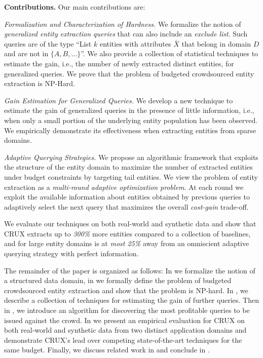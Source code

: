 \noindent
{\bf Contributions.} Our main contributions are:
\squishlist
\item {\em Formalization and Characterization of Hardness.} We formalize the notion of {\em generalized entity extraction queries} that can also include an {\em exclude list}. Such queries are of the type ``List $k$ entities with attributes $\bar{X}$ that belong in domain $D$ and are not in $\{A, B, ...\}$''.  We also provide a collection of statistical techniques to estimate the gain, i.e., the number of newly extracted distinct entities, for generalized queries. We prove that the problem of budgeted crowdsourced entity extraction is NP-Hard. 
\item {\em Gain Estimation for Generalized Queries.}  We develop a new technique to estimate the gain of generalized queries in the presence of little information, i.e., when only a small portion of the underlying entity population has been observed. We empirically demonstrate its effectiveness when extracting entities from sparse domains.
\item {\em Adaptive Querying Strategies.} We propose an algorithmic framework that exploits the structure of the entity domain to maximize the number of extracted entities under budget constraints by targeting tail entities. We view the problem of entity extraction as a {\em multi-round adaptive optimization problem}. At  each round we exploit the available information about entities obtained by previous queries to adaptively select the next query that maximizes the overall {\em cost-gain} trade-off.
\squishend

We evaluate our techniques on both real-world and synthetic data and show that CRUX extracts up to {\em 300\%} more entities compared to a collection of baselines, and for large entity domains is at {\em most 25\%} away from an omniscient adaptive querying strategy with perfect information.

The remainder of the paper is organized as follows: In  we formalize the notion of a structured data domain, in  we formally define the problem of budgeted crowdsourced entity extraction and show that the problem is NP-hard. In , we describe a collection of techniques for estimating the gain of further queries. Then in , we introduce an algorithm for discovering the most profitable queries to be issued against the crowd. In  we present an empirical evaluation for CRUX on both real-world and synthetic data from two distinct application domains and demonstrate CRUX's lead over competing state-of-the-art techniques for the same budget. Finally, we discuss related work in  and conclude in .